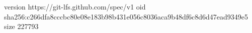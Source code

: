 version https://git-lfs.github.com/spec/v1
oid sha256:c266dfa8cccbc80e08e183b98b431e056c8036aca9b48df6c8d6d47ead9349e5
size 227793
